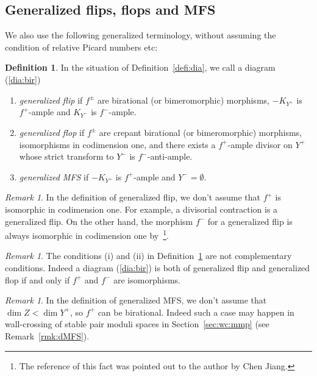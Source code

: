 \documentclass[11pt]{amsart}
\theoremstyle{plain}
\theoremstyle{definition}
\newtheorem{defi}[thm]{Definition}
\theoremstyle{remark}
\newtheorem{rmk}[thm]{Remark}
\begin{document}
\subsection{Generalized flips, flops and MFS}
We also use the following generalized terminology, 
without assuming the condition of relative Picard numbers etc: 
\begin{defi}\label{defi:generalized}
In the situation of Definition~\ref{defi:dia}, 
we call a
 diagram (\ref{dia:bir}) 
\begin{enumerate}
\item \textit{generalized flip} if $f^{\pm}$ are  
birational (or bimeromorphic) morphisms, 
$-K_{Y^{+}}$ is $f^{+}$-ample and 
$K_{Y^{-}}$ is $f^{-}$-ample. 
\item \textit{generalized flop} if $f^{\pm}$ are crepant birational (or bimeromorphic)
morphisms, isomorphisms in codimension one, 
and 
there exists a 
$f^+$-ample divisor on $Y^+$
whose strict transform to $Y^-$ is 
$f^-$-anti-ample.  
\item \textit{generalized MFS}
 if $-K_{Y^{+}}$ is $f^{+}$-ample and $Y^{-}=\emptyset$. 
\end{enumerate}
\end{defi}

\begin{rmk}\label{rmk:codim}
In the definition of generalized flip, we 
don't assume that $f^{+}$ is isomorphic in codimension one. 
For example, a divisorial contraction is a generalized flip. 
On the other hand, the morphism $f^{-}$ for a generalized flip
is always isomorphic in codimension 
one by~\cite[Lemma~3.38]{KM}\footnote{The reference of this fact was
pointed out to the author by Chen Jiang.}. 
\end{rmk}

\begin{rmk}\label{rmk:isom}
The conditions (i) and (ii) 
in Definition~\ref{defi:generalized} are not complementary conditions. 
Indeed a diagram (\ref{dia:bir}) is both of 
generalized flip and generalized flop if and only if 
$f^{+}$ and $f^-$ are isomorphisms. 
\end{rmk}

\begin{rmk}\label{rmk:genMFS}
In the definition of generalized MFS, 
we don't assume that 
$\dim Z<\dim Y^+$, 
so $f^+$ can be birational. 
Indeed such a case may happen in wall-crossing 
of stable pair moduli spaces in 
Section~\ref{sec:wc:mmp} (see Remark~\ref{rmk:dMFS}). 
\end{rmk}
\end{document}
